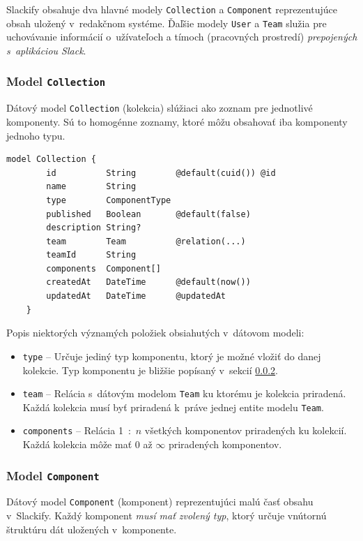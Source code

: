 \noindent Slackify obsahuje dva hlavné modely \texttt{Collection} a \texttt{Component} reprezentujúce obsah uložený v~redakčnom systéme. Ďaľšie modely \texttt{User} a \texttt{Team} služia pre uchovávanie informácií o~užívateľoch a tímoch (pracovných prostredí) \emph{prepojených s~aplikáciou Slack}.

\subsubsection{Model \texttt{Collection}}
Dátový model \texttt{Collection} (kolekcia) slúžiaci ako zoznam pre jednotlivé komponenty. Sú to homogénne zoznamy, ktoré môžu obsahovať iba komponenty jednoho typu. \\

\begin{lstlisting}[caption=Dátový model \texttt{Collection} v~konfiguračnom súbore \texttt{prisma}.]
	model Collection {
		id          String        @default(cuid()) @id
		name        String
		type        ComponentType
		published   Boolean       @default(false)
		description String?
		team        Team          @relation(...)
		teamId      String
		components  Component[]
		createdAt   DateTime      @default(now())
		updatedAt   DateTime      @updatedAt
	}
\end{lstlisting}

\medskip

\noindent Popis niektorých významých položiek obsiahutých v~dátovom modeli:

\begin{itemize}
	\item \texttt{type} -- Určuje jediný typ komponentu, ktorý je možné vložiť do danej kolekcie. Typ komponentu je bližšie popísaný v~sekcií \ref{impl:model:component}.
	\item \texttt{team} -- Relácia s~dátovým modelom \texttt{Team} ku ktorému je kolekcia priradená. Každá kolekcia musí byť priradená k~práve jednej entite modelu \texttt{Team}.
	\item \texttt{components} -- Relácia 1~:~$n$ všetkých komponentov priradených ku kolekcií. Každá kolekcia môže mať 0 až $\infty$ priradených komponentov.
\end{itemize}

\subsubsection{Model \texttt{Component}}
\label{impl:model:component}
Dátový model \texttt{Component} (komponent) reprezentujúci malú časť obsahu v~Slackify. Každý komponent \emph{musí mať zvolený typ}, ktorý určuje vnútornú štruktúru dát uložených v~komponente. \\

